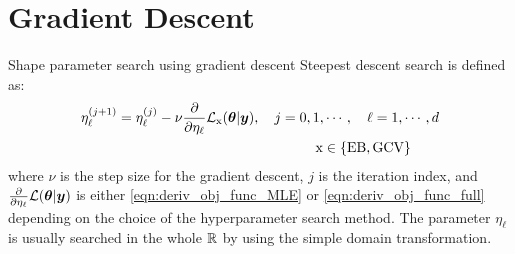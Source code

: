 \documentclass[handout, 10pt,compress,xcolor={usenames,dvipsnames}]{beamer} %
\newcommand{\bm}[1]{\boldsymbol{#1}}
\newcommand{\MLE}{\textup{EB}}
\newcommand{\GCV}{\textup{GCV}}
\renewcommand{\vtheta}{{\bm{\theta}}}
\begin{document}
\section{Gradient Descent}

\begin{frame}{Shape parameter search using gradient descent}
	Steepest descent search is defined as:
	\begin{align*}
	\eta^{(j+1)}_\ell &= \eta^{(j)}_\ell - \nu \frac{\partial}{\partial \eta_\ell} \mathcal{L}_{\bm{\textup{x}}}(\vtheta | \vy), \quad j=0,1,\cdots, \quad \ell = 1, \cdots, d \\
	& \hspace{5cm} \bm{\textup{x}} \in \{\MLE, \GCV\}
	\end{align*}
	where $\nu$ is the step size for the gradient descent, $j$ is the iteration index, and $\frac{\partial}{\partial \eta_\ell} \mathcal{L}(\vtheta | \vy)$ is either \eqref{eqn:deriv_obj_func_MLE} or \eqref{eqn:deriv_obj_func_full} depending on the choice of the hyperparameter search method. The parameter $\eta_\ell$ is usually searched in the whole $\mathbb{R}$ by using the simple domain transformation.
\end{frame}
\end{document}
